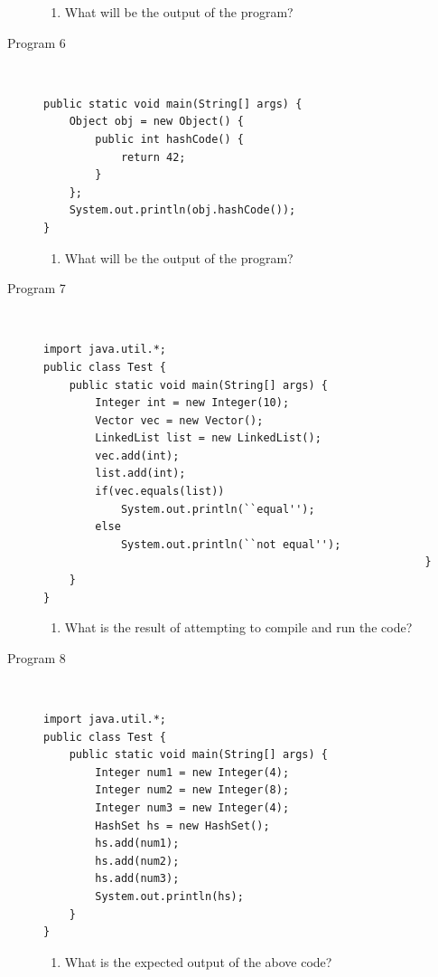 \documentclass[11pt,a4paper]{article}
\def\AnswerBox{\fbox{\begin{minipage}{4in}\hfill\vspace{0.5in}\end{minipage}}}
\begin{document}
\begin{description}
\AnswerBox

\begin{enumerate}[label=\bfseries Q\arabic*:]\itemsep10pt
\item What will be the output of the program?
\end{enumerate}

\item [Program 6] \
\begin{lstlisting}
public static void main(String[] args) {
    Object obj = new Object() {
        public int hashCode() {
            return 42;
        }
    }; 
    System.out.println(obj.hashCode()); 
}
\end{lstlisting}

\AnswerBox

\begin{enumerate}[label=\bfseries Q\arabic*:]\itemsep10pt
 \item What will be the output of the program?
    \end{enumerate}

\item [Program 7] \
\begin{lstlisting}
import java.util.*;
public class Test {
    public static void main(String[] args) {
        Integer int = new Integer(10);
        Vector vec = new Vector();
        LinkedList list = new LinkedList();
        vec.add(int);
        list.add(int);
        if(vec.equals(list)) 
            System.out.println(``equal'');
        else  
            System.out.println(``not equal'');
                                                           }
    }
}
\end{lstlisting}

\AnswerBox

\begin{enumerate}[label=\bfseries Q\arabic*:]\itemsep10pt
\item What is the result of attempting to compile and run the code?
\end{enumerate}

\item [Program 8] \
\begin{lstlisting}
import java.util.*;
public class Test {
    public static void main(String[] args) {
        Integer num1 = new Integer(4);
        Integer num2 = new Integer(8);
        Integer num3 = new Integer(4);
        HashSet hs = new HashSet();
        hs.add(num1);
        hs.add(num2);
        hs.add(num3); 
        System.out.println(hs);
    }
}
\end{lstlisting}

\AnswerBox


\begin{enumerate}[label=\bfseries Q\arabic*:]\itemsep10pt
\item What is the expected output of the above code?
    \end{enumerate}

\end{description}
\end{document}
